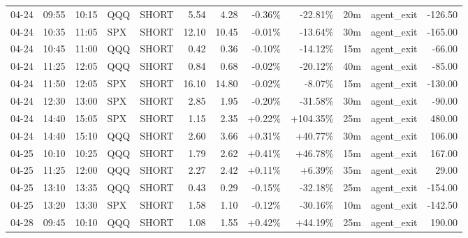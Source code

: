\documentclass[11pt,a4paper]{article}
\begin{document}
\begin{center}
\begin{longtable}{>{\color{txtmain}}l l l l l r r r r r >{\color{txtmain}}l r}
04-24 & 09:55 & 10:15 & QQQ & SHORT & 5.54 & 4.28 & \textcolor{lossred}{-0.36\%} & \textcolor{lossred}{-22.81\%} & 20m & agent\_exit & \textcolor{lossred}{-126.50} \\
04-24 & 10:35 & 11:05 & SPX & SHORT & 12.10 & 10.45 & \textcolor{lossred}{-0.01\%} & \textcolor{lossred}{-13.64\%} & 30m & agent\_exit & \textcolor{lossred}{-165.00} \\
04-24 & 10:45 & 11:00 & QQQ & SHORT & 0.42 & 0.36 & \textcolor{lossred}{-0.10\%} & \textcolor{lossred}{-14.12\%} & 15m & agent\_exit & \textcolor{lossred}{-66.00} \\
04-24 & 11:25 & 12:05 & QQQ & SHORT & 0.84 & 0.68 & \textcolor{lossred}{-0.02\%} & \textcolor{lossred}{-20.12\%} & 40m & agent\_exit & \textcolor{lossred}{-85.00} \\
04-24 & 11:50 & 12:05 & SPX & SHORT & 16.10 & 14.80 & \textcolor{lossred}{-0.02\%} & \textcolor{lossred}{-8.07\%} & 15m & agent\_exit & \textcolor{lossred}{-130.00} \\
04-24 & 12:30 & 13:00 & SPX & SHORT & 2.85 & 1.95 & \textcolor{lossred}{-0.20\%} & \textcolor{lossred}{-31.58\%} & 30m & agent\_exit & \textcolor{lossred}{-90.00} \\
04-24 & 14:40 & 15:05 & SPX & SHORT & 1.15 & 2.35 & \textcolor{wingreen}{+0.22\%} & \textcolor{wingreen}{+104.35\%} & 25m & agent\_exit & \textcolor{wingreen}{480.00} \\
04-24 & 14:40 & 15:10 & QQQ & SHORT & 2.60 & 3.66 & \textcolor{wingreen}{+0.31\%} & \textcolor{wingreen}{+40.77\%} & 30m & agent\_exit & \textcolor{wingreen}{106.00} \\
04-25 & 10:10 & 10:25 & QQQ & SHORT & 1.79 & 2.62 & \textcolor{wingreen}{+0.41\%} & \textcolor{wingreen}{+46.78\%} & 15m & agent\_exit & \textcolor{wingreen}{167.00} \\
04-25 & 11:25 & 12:00 & QQQ & SHORT & 2.27 & 2.42 & \textcolor{wingreen}{+0.11\%} & \textcolor{wingreen}{+6.39\%} & 35m & agent\_exit & \textcolor{wingreen}{29.00} \\
04-25 & 13:10 & 13:35 & QQQ & SHORT & 0.43 & 0.29 & \textcolor{lossred}{-0.15\%} & \textcolor{lossred}{-32.18\%} & 25m & agent\_exit & \textcolor{lossred}{-154.00} \\
04-25 & 13:20 & 13:30 & SPX & SHORT & 1.58 & 1.10 & \textcolor{lossred}{-0.12\%} & \textcolor{lossred}{-30.16\%} & 10m & agent\_exit & \textcolor{lossred}{-142.50} \\
04-28 & 09:45 & 10:10 & QQQ & SHORT & 1.08 & 1.55 & \textcolor{wingreen}{+0.42\%} & \textcolor{wingreen}{+44.19\%} & 25m & agent\_exit & \textcolor{wingreen}{190.00} \\

\end{longtable}
\end{center}
\end{document}
